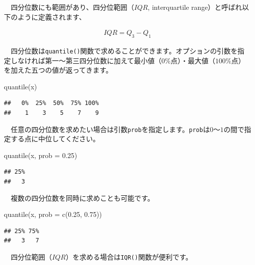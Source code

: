\documentclass[
  12pt,
]{book}
\newenvironment{Shaded}{\begin{snugshade}}{\end{snugshade}}
\newcommand{\AttributeTok}[1]{\textcolor[rgb]{0.77,0.63,0.00}{#1}}
\newcommand{\FloatTok}[1]{\textcolor[rgb]{0.00,0.00,0.81}{#1}}
\newcommand{\FunctionTok}[1]{\textcolor[rgb]{0.00,0.00,0.00}{#1}}
\newcommand{\NormalTok}[1]{#1}
\begin{document}
　四分位数にも範囲があり、四分位範囲（\(IQR\), interquartile range）と呼ばれ以下のように定義されます、

\begin{align}
  IQR = Q_3 - Q_1 \label{eq:IQR}
\end{align}

　四分位数は\texttt{quantile()}関数で求めることができます。オプションの引数を指定しなければ第一〜第三四分位数に加えて最小値（\(0\%\mbox{点}\)）・最大値（\(100\%\mbox{点}\)）を加えた五つの値が返ってきます。

\begin{Shaded}
\begin{Highlighting}[numbers=left,,]
\FunctionTok{quantile}\NormalTok{(x)}
\end{Highlighting}
\end{Shaded}

\begin{verbatim}
##   0%  25%  50%  75% 100% 
##    1    3    5    7    9
\end{verbatim}

　任意の四分位数を求めたい場合は引数\texttt{prob}を指定します。\texttt{prob}は\(0\)〜\(1\)の間で指定する点に中位してください。

\begin{Shaded}
\begin{Highlighting}[numbers=left,,]
\FunctionTok{quantile}\NormalTok{(x, }\AttributeTok{prob =} \FloatTok{0.25}\NormalTok{)}
\end{Highlighting}
\end{Shaded}

\begin{verbatim}
## 25% 
##   3
\end{verbatim}

　複数の四分位数を同時に求めことも可能です。

\begin{Shaded}
\begin{Highlighting}[numbers=left,,]
\FunctionTok{quantile}\NormalTok{(x, }\AttributeTok{prob =} \FunctionTok{c}\NormalTok{(}\FloatTok{0.25}\NormalTok{, }\FloatTok{0.75}\NormalTok{))}
\end{Highlighting}
\end{Shaded}

\begin{verbatim}
## 25% 75% 
##   3   7
\end{verbatim}

　四分位範囲（\(IQR\)）を求める場合は\texttt{IQR()}関数が便利です。
\end{document}
